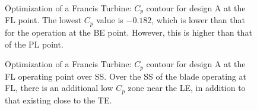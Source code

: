 \begin{figure}[h!]
\begin{minipage}[b]{1\linewidth}
 \centering
\end{minipage}
\caption{Optimization of a Francis Turbine: $C_p$ contour for design A at the FL point. The lowest  $C_p$ value is $-0.182$, which is lower than that for the operation at the BE point. However, this is higher than that of the PL point.}
\label{Francis-A-FL}
\end{figure}


\begin{figure}[h!]
\begin{minipage}[b]{1\linewidth}
 \centering
\end{minipage}
\caption{Optimization of a Francis Turbine: $C_p$ contour for design A at the FL operating point over SS. Over the SS of the blade operating at FL, there is an additional low $C_p$ zone near the LE, in addition to that existing close to the TE. }
\label{Francis-A-SS}
\end{figure}


